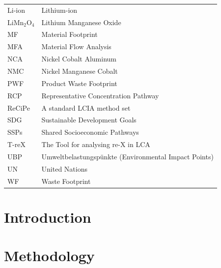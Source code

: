 \documentclass[review,3p,authoryear]{elsarticle}
\newcommand{\cbox}[1]{
    \begin{tcolorbox}[hbox, colback=red!5!white, colframe=red!65!black, boxrule=0.25pt, boxsep=2pt, left=2pt, right=2pt, top=1pt, bottom=1pt]
        \small\sffamily #1
    \end{tcolorbox}
    }
\begin{document}
\begin{table}[H]
\begin{tabular}{ll}
        Li-ion            & Lithium-ion                                                         \\
        LiMn\(_2\)O\(_4\) & Lithium Manganese Oxide                                             \\
        MF                & Material Footprint                                                  \\
        MFA               & Material Flow Analysis                                              \\
        NCA               & Nickel Cobalt Aluminum                                              \\
        NMC               & Nickel Manganese Cobalt                                             \\
        PWF               & Product Waste Footprint                                             \\
        RCP               & Representative Concentration Pathway                                \\
        ReCiPe            & A standard LCIA method set                                          \\
        SDG               & Sustainable Development Goals                                       \\
        SSPs              & Shared Socioeconomic Pathways                                       \\
        T-reX             & The Tool for analysing re-X in LCA                                  \\
        UBP               & Umweltbelastungspünkte (Environmental Impact Points)                \\
        UN                & United Nations                                                      \\
        WF                & Waste Footprint                                                     \\
        \bottomrule
    \end{tabular}
\end{table}

\section{Introduction}\label{sec:introduction}


\section{Methodology}\label{sec:methodology}

\end{document}
